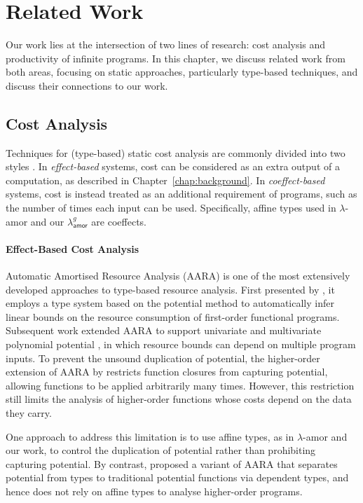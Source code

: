 \chapter{Related Work}\label{chap:relatedWork}
Our work lies at the intersection of two lines of research: 
cost analysis and productivity of infinite programs. 
In this chapter, we discuss related work from both areas, 
focusing on static approaches, particularly type-based techniques, 
and discuss their connections to our work.

\section{Cost Analysis}
\label{sec:rw-cost}
Techniques for (type-based) static cost analysis are commonly divided into two styles
\citep{rajaniUnifyingTypetheoryHigherorder2021a}. In \emph{effect-based}
systems, cost can be considered as an extra output of a computation, as described in
Chapter~\ref{chap:background}. In \emph{coeffect-based} systems, cost is
instead treated as an additional requirement of programs, such
as the number of times each input can be used. Specifically, affine types used in $\lambda$-amor 
and our $\lambda^g_{\mathsf{amor}}$ are coeffects.

\subsubsection{Effect-Based Cost Analysis}
Automatic Amortised Resource Analysis (AARA) is one of the most extensively developed approaches to type-based resource analysis.
First presented by \citet{hofmannJ03}, it employs a type system based on the potential method to automatically infer linear bounds on the resource consumption of first-order functional programs. 
Subsequent work extended AARA to support univariate and multivariate polynomial potential \citep{hoffmannH10, hoffmannMultivariateAmortizedResource2012a}, 
in which resource bounds can depend on multiple program inputs. 
To prevent the unsound duplication of potential, the higher-order extension of AARA by \citet{JostHLH10} restricts function closures from capturing potential, 
allowing functions to be applied arbitrarily many times. However, this restriction still limits the analysis of higher-order functions whose costs depend on the data they carry.

One approach to address this limitation is to use affine types, as in $\lambda$-amor \citep{rajaniUnifyingTypetheoryHigherorder2021a} and our work,
to control the duplication of potential rather than prohibiting capturing potential.
By contrast, \citet{xuW26} proposed a variant of AARA that separates potential from types to traditional potential functions via dependent types, 
and hence does not rely on affine types to analyse higher-order programs.

